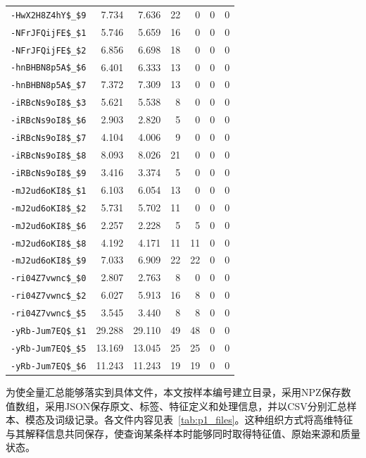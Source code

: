 \begin{longtable}{lrrrrrr}
\nolinkurl{-HwX2H8Z4hY$_$9} & 7.734 & 7.636 & 22 & 0 & 0 & 0\\
\nolinkurl{-NFrJFQijFE$_$1} & 5.746 & 5.659 & 16 & 0 & 0 & 0\\
\nolinkurl{-NFrJFQijFE$_$2} & 6.856 & 6.698 & 18 & 0 & 0 & 0\\
\nolinkurl{-hnBHBN8p5A$_$6} & 6.401 & 6.333 & 13 & 0 & 0 & 0\\
\nolinkurl{-hnBHBN8p5A$_$7} & 7.372 & 7.309 & 13 & 0 & 0 & 0\\
\nolinkurl{-iRBcNs9oI8$_$3} & 5.621 & 5.538 & 8 & 0 & 0 & 0\\
\nolinkurl{-iRBcNs9oI8$_$6} & 2.903 & 2.820 & 5 & 0 & 0 & 0\\
\nolinkurl{-iRBcNs9oI8$_$7} & 4.104 & 4.006 & 9 & 0 & 0 & 0\\
\nolinkurl{-iRBcNs9oI8$_$8} & 8.093 & 8.026 & 21 & 0 & 0 & 0\\
\nolinkurl{-iRBcNs9oI8$_$9} & 3.416 & 3.374 & 5 & 0 & 0 & 0\\
\nolinkurl{-mJ2ud6oKI8$_$1} & 6.103 & 6.054 & 13 & 0 & 0 & 0\\
\nolinkurl{-mJ2ud6oKI8$_$2} & 5.731 & 5.702 & 11 & 0 & 0 & 0\\
\nolinkurl{-mJ2ud6oKI8$_$6} & 2.257 & 2.228 & 5 & 5 & 0 & 0\\
\nolinkurl{-mJ2ud6oKI8$_$8} & 4.192 & 4.171 & 11 & 11 & 0 & 0\\
\nolinkurl{-mJ2ud6oKI8$_$9} & 7.033 & 6.909 & 22 & 22 & 0 & 0\\
\nolinkurl{-ri04Z7vwnc$_$0} & 2.807 & 2.763 & 8 & 0 & 0 & 0\\
\nolinkurl{-ri04Z7vwnc$_$2} & 6.027 & 5.913 & 16 & 8 & 0 & 0\\
\nolinkurl{-ri04Z7vwnc$_$5} & 3.545 & 3.440 & 8 & 8 & 0 & 0\\
\nolinkurl{-yRb-Jum7EQ$_$1} & 29.288 & 29.110 & 49 & 48 & 0 & 0\\
\nolinkurl{-yRb-Jum7EQ$_$5} & 13.169 & 13.045 & 25 & 25 & 0 & 0\\
\nolinkurl{-yRb-Jum7EQ$_$6} & 11.243 & 11.243 & 19 & 19 & 0 & 0\\
\end{longtable}
\endgroup

为使全量汇总能够落实到具体文件，本文按样本编号建立目录，采用NPZ保存数值数组，采用JSON保存原文、标签、特征定义和处理信息，并以CSV分别汇总样本、模态及词级记录。各文件内容见表~\ref{tab:p1_files}。这种组织方式将高维特征与其解释信息共同保存，使查询某条样本时能够同时取得特征值、原始来源和质量状态。

